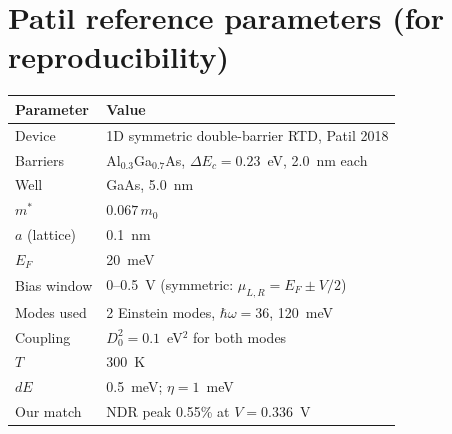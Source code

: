\documentclass[11pt,a4paper,onecolumn]{article}
\begin{document}
\appendix
\section{Patil reference parameters (for reproducibility)}
\small
\begin{tabular}{ll}
\toprule
Parameter & Value \\
\midrule
Device         & 1D symmetric double-barrier RTD, Patil 2018 \\
Barriers       & Al$_{0.3}$Ga$_{0.7}$As, $\Delta E_c = 0.23$~eV, 2.0~nm each \\
Well           & GaAs, 5.0~nm \\
$m^*$          & $0.067\,m_0$ \\
$a$ (lattice)  & 0.1~nm \\
$E_F$          & 20~meV \\
Bias window    & 0--0.5~V (symmetric: $\mu_{L,R} = E_F \pm V/2$) \\
Modes used     & 2 Einstein modes, $\hbar\omega = 36$, 120~meV \\
Coupling       & $D_0^2 = 0.1$~eV$^2$ for both modes \\
$T$            & 300~K \\
$dE$           & 0.5~meV; $\eta = 1$~meV \\
Our match      & NDR peak 0.55\% at $V = 0.336$~V \\
\bottomrule
\end{tabular}
\end{document}
